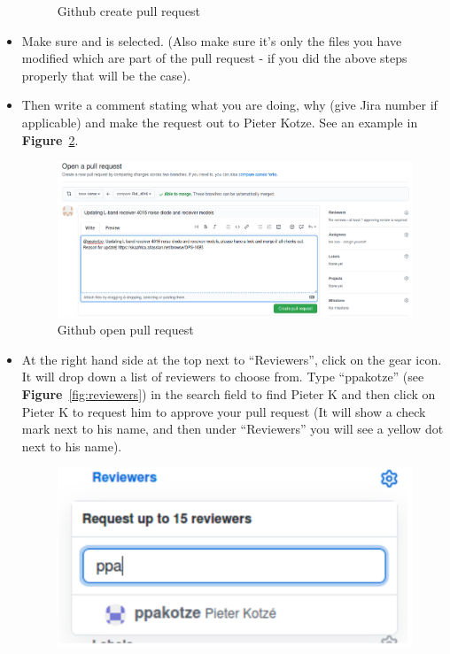 \begin{itemize}
\begin{figure}[H]
	\caption{Github create pull request }
	\label{fig:image73}
\end{figure}



\item Make sure  and  is
selected. (Also make sure it’s only the files you have modified which are part
of the pull request - if you did the above steps properly that will be the case).
\item Then write a comment stating what you are doing, why (give Jira number if
applicable) and make the request out to Pieter Kotze. See an example in \textbf{Figure}~\ref{fig:image47}.
\begin{figure}[H]
	\centering
	\includegraphics[scale=0.33]{Chapters/images/image47.png}
	
	\caption{Github open pull request }
	\label{fig:image47}
\end{figure}
\item At the right hand side at the top next to “Reviewers”, click on the gear icon. It
will drop down a list of reviewers to choose from. Type “ppakotze” (see \textbf{Figure}~\ref{fig:reviewers}) in the
search field to find Pieter K and then click on Pieter K to request him to
approve your pull request (It will show a check mark next to his name, and
then under “Reviewers” you will see a yellow dot next to his name).

\begin{figure}[H]
	\centering
	\includegraphics[scale=0.26]{Chapters/images/reviewers.png}
	

\end{figure}
\end{itemize}
